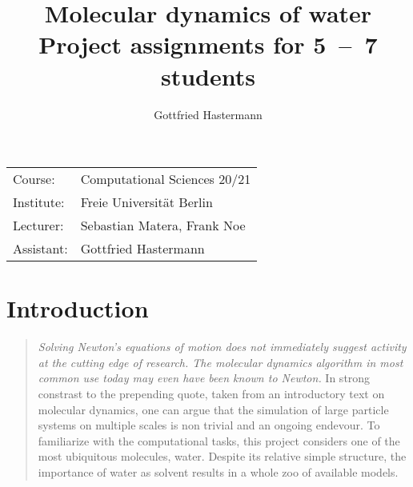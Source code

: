 \documentclass[a4paper,11pt]{amsart}
\title{Molecular dynamics of water\\[0.25em]
        \small{
        Project assignments for 5~--~7 students
        }
}
\author{Gottfried Hastermann}
\begin{document}
\noindent
\begin{flushleft}
\begin{tabular}{l l}
	Course: & Computational Sciences 20/21\\
	Institute: & Freie Universit\"at Berlin\\
	Lecturer:  & Sebastian Matera, Frank Noe\\
	Assistant: & Gottfried Hastermann
\end{tabular}
\end{flushleft}
\bigskip
\maketitle
\section{Introduction}
\begin{quote}
  \textit{
  Solving Newton’s equations of motion does not immediately suggest activity at the cutting
edge of research. The molecular dynamics algorithm in most common use today may even
have been known to Newton.} \cite{Attig2004}
In strong constrast to the prepending quote, taken from an introductory text on molecular dynamics, 
one can argue that the simulation of large particle systems on multiple scales is non trivial and an ongoing endevour. 
To familiarize with the computational tasks, this project considers one of the most ubiquitous molecules, water.
Despite its relative simple structure, the importance of water as solvent results in a whole zoo of available models.
\end{quote}
\end{document}
